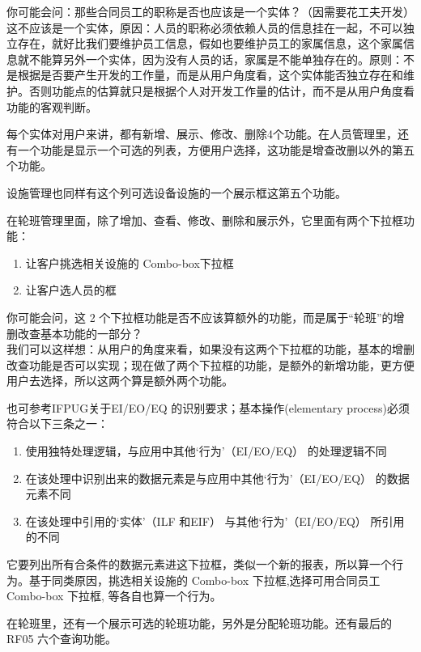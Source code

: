 你可能会问：那些合同员工的职称是否也应该是一个实体？（因需要花工夫开发）\\
这不应该是一个实体，原因：人员的职称必须依赖人员的信息挂在一起，不可以独立存在，就好比我们要维护员工信息，假如也要维护员工的家属信息，这个家属信息就不能算另外一个实体，因为没有人员的话，家属是不能单独存在的。原则：不是根据是否要产生开发的工作量，而是从用户角度看，这个实体能否独立存在和维护。否则功能点的估算就只是根据个人对开发工作量的估计，而不是从用户角度看功能的客观判断。

每个实体对用户来讲，都有新增、展示、修改、删除4个功能。在人员管理里，还有一个功能是显示一个可选的列表，方便用户选择，这功能是增查改删以外的第五个功能。

设施管理也同样有这个列可选设备设施的一个展示框这第五个功能。

在轮班管理里面，除了增加、查看、修改、删除和展示外，它里面有两个下拉框功能：

\begin{enumerate}
\tightlist
\item
  让客户挑选相关设施的 Combo-box下拉框
\item
  让客户选人员的框
\end{enumerate}

你可能会问，这 2
个下拉框功能是否不应该算额外的功能，而是属于``轮班''的增删改查基本功能的一部分？\\
我们可以这样想：从用户的角度来看，如果没有这两个下拉框的功能，基本的增删改查功能是否可以实现；现在做了两个下拉框的功能，是额外的新增功能，更方便用户去选择，所以这两个算是额外两个功能。

也可参考IFPUG关于EI/EO/EQ 的识别要求；基本操作(elementary
process)必须符合以下三条之一：

\begin{enumerate}
\tightlist
\item
  使用独特处理逻辑，与应用中其他`行为'（EI/EO/EQ） 的处理逻辑不同
\item
  在该处理中识别出来的数据元素是与应用中其他`行为'（EI/EO/EQ）
  的数据元素不同
\item
  在该处理中引用的`实体'（ILF 和EIF） 与其他`行为'（EI/EO/EQ）
  所引用的不同
\end{enumerate}

它要列出所有合条件的数据元素进这下拉框，类似一个新的报表，所以算一个行为。基于同类原因，挑选相关设施的
Combo-box 下拉框,选择可用合同员工 Combo-box 下拉框, 等各自也算一个行为。

在轮班里，还有一个展示可选的轮班功能，另外是分配轮班功能。还有最后的
RF05 六个查询功能。


